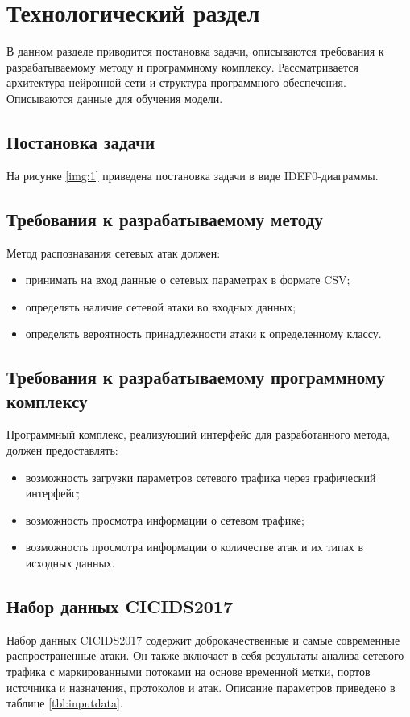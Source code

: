 \chapter{Технологический раздел}
В данном разделе приводится постановка задачи, описываются требования к разрабатываемому методу
и программному комплексу. Рассматривается архитектура нейронной сети и структура программного обеспечения. Описываются данные для обучения модели.

\section{Постановка задачи}

На рисунке \ref*{img:1} приведена постановка задачи в виде IDEF0-диаграммы.


\section{Требования к разрабатываемому методу}
Метод распознавания сетевых атак должен:

\begin{itemize}
    \item принимать на вход данные о сетевых параметрах в формате CSV;
    \item определять наличие сетевой атаки во входных данных;
    \item определять вероятность принадлежности атаки к определенному классу.
\end{itemize}

\section{Требования к разрабатываемому программному комплексу}
Программный комплекс, реализующий интерфейс для разработанного
метода, должен предоставлять:

\begin{itemize}
    \item возможность загрузки параметров сетевого трафика через графический интерфейс;
    \item возможность просмотра информации о сетевом трафике;
    \item возможность просмотра информации о количестве атак и их типах в исходных данных.
\end{itemize}


\section{Набор данных CICIDS2017}
Набор данных CICIDS2017 содержит доброкачественные и самые
современные распространенные атаки.
Он также включает в себя результаты анализа сетевого трафика с маркированными потоками на основе
временной метки, портов источника и
назначения, протоколов и атак. Описание параметров приведено в таблице \ref{tbl:inputdata}.

